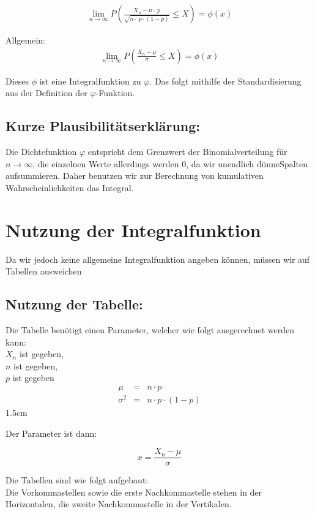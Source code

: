 \documentclass[12pt,a4paper,twocolumn]{article}
\begin{document}
\begin{eqnarray}
\lim\limits_{n \rightarrow \infty} P \left(\frac{X_n - n\cdot\ p}{\sqrt{n\cdot\ p\cdot(1 - p)}} \le X\right) = \phi(x)
\end{eqnarray}

Allgemein:
\begin{eqnarray}
\lim\limits_{n \rightarrow \infty} P \left(\frac{X_n - \mu}{\sigma} \le X\right) = \phi(x)
\end{eqnarray}

Dieses $\phi$ ist eine Integralfunktion zu $\varphi$. Das folgt mithilfe der Standardisierung aus der Definition der $\varphi$-Funktion. 

\subsection{Kurze Plausibilitätserklärung:}

Die Dichtefunktion $\varphi$ entspricht dem Grenzwert der Binomialverteilung für $n \to \infty$, die einzelnen Werte allerdings werden $0$, da wir \glqq unendlich dünne\grqq Spalten aufsummieren. Daher benutzen wir zur Berechnung von kumulativen Wahrscheinlichkeiten das Integral.

\section{Nutzung der Integralfunktion}
Da wir jedoch keine allgemeine Integralfunktion angeben können, müssen wir auf Tabellen ausweichen
\subsection{Nutzung der Tabelle:}
Die Tabelle benötigt einen Parameter, welcher wie folgt ausgerechnet werden kann:\\
{\center $X_n$ ist gegeben,\\
$n$ ist gegeben,\\
$p$ ist gegeben\\}
\begin{eqnarray}
\mu &=& n \cdot p \\
\sigma^2 &=& n \cdot p \cdot (1 - p)
\end{eqnarray}
\setlength{\fboxsep} {1.5cm}

Der Parameter ist dann:

$$
x = \frac{X_n - \mu}{\sigma}
$$

Die Tabellen sind wie folgt aufgebaut:\\
Die Vorkommastellen sowie die erste Nachkommastelle stehen in der Horizontalen, die zweite Nachkommastelle in der Vertikalen.
\end{document}
